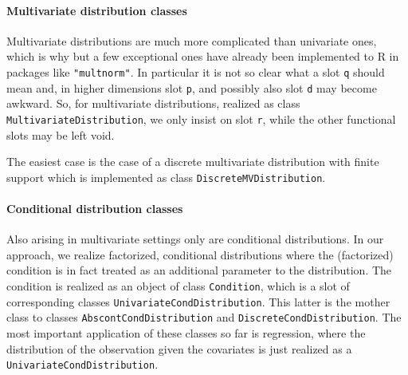 \documentclass[11pt]{article}
\newcommand{\code}[1]{{\tt #1}}
\newcommand{\pkg}[1]{{\tt "#1"}}
\begin{document}
\paragraph{Multivariate distribution classes}

Multivariate distributions are much more complicated than univariate ones,
which is why but a few exceptional ones have already been implemented to R in
packages like \pkg{multnorm}. In particular it is not so clear what a slot 
\code{q} should mean and, in higher dimensions slot \code{p}, and possibly also 
slot \code{d} may become awkward. So, for multivariate distributions, realized 
as class \code{MultivariateDistribution}, we only insist on slot \code{r}, while 
the other functional slots may be left void.

The easiest case is the case of a discrete multivariate distribution with finite 
support which is implemented as class \code{DiscreteMVDistribution}.

\paragraph{Conditional distribution classes}

Also arising in multivariate settings only are conditional distributions. In our 
approach, we realize factorized, conditional distributions where the 
(factorized) condition is in fact treated as an additional parameter to the 
distribution. The condition is realized as an object of class \code{Condition}, 
which is a slot of corresponding classes \code{UnivariateCondDistribution}. 
This latter is the mother class to classes
\code{AbscontCondDistribution} and \code{DiscreteCondDistribution}.
The most important application of these classes so far is regression, where
the distribution of the observation given the covariates is just realized as
a \code{UnivariateCondDistribution}.
\end{document}
